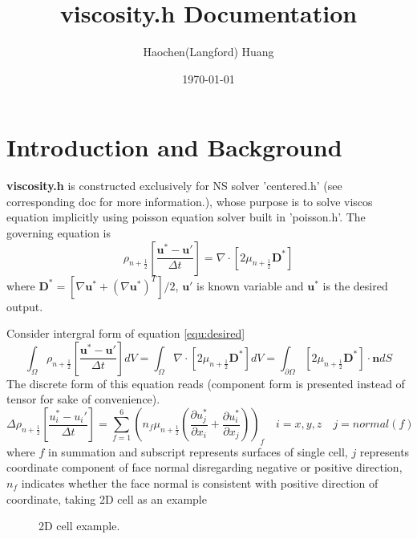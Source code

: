 \documentclass[a4paper]{article}
\title{viscosity.h Documentation}
\author{Haochen(Langford) Huang}
\date{\today}
\begin{document}
\maketitle

\section{Introduction and Background}
\textbf{viscosity.h} is constructed exclusively for NS solver 'centered.h' (see corresponding doc for more information.), whose purpose is to solve viscos equation implicitly using poisson equation solver built in 'poisson.h'. The governing equation is 
\begin{equation}\label{equ:desired}
  \rho_{n+ \frac{1}{2}}[ \frac{ \mathbf{u}^*- \mathbf{u}'}{\Delta t}] = \nabla\cdot [2\mu_{n+ \frac{1}{2}} \mathbf{D}^*]
\end{equation}
where $ \mathbf{D}^* = [\nabla \mathbf{u}^*+ (\nabla \mathbf{u}^*)^T]/2$, $ \mathbf{u}'$ is known variable and $ \mathbf{u}^*$ is the desired output.\par
Consider intergral form of equation \ref{equ:desired}
\begin{equation}
  \int_{\Omega}\rho_{n+ \frac{1}{2}} [ \frac{ \mathbf{u}^*- \mathbf{u}'}{\Delta t}]dV = \int_{\Omega}\nabla\cdot[2\mu_{n+ \frac{1}{2}} \mathbf{D}^*] dV = \int_{\partial \Omega} [2\mu_{n+ \frac{1}{2}} \mathbf{D}^*]\cdot \mathbf{n}dS
\end{equation}
The discrete form of this equation reads (component form is presented instead of tensor for sake of convenience).
\begin{equation}\label{equ:discrete}
  \Delta \rho_{n+ \frac{1}{2}} [ \frac{u_i^*-u_i'}{\Delta t} ] = \sum_{f = 1}^6(n_f \mu_{n+ \frac{1}{2}}( \frac{\partial u_j^*}{\partial x_i}+ \frac{\partial u_i^*}{\partial x_j}))_f \quad i= x,y,z\quad j = normal(f)
\end{equation}
where $f$ in summation and subscript represents surfaces of single cell, $j$ represents coordinate component of face normal disregarding negative or positive direction, $n_f$ indicates whether the face normal is consistent with positive direction of coordinate, taking 2D cell as an example
\begin{figure}[H]
    \centering
    \caption{2D cell example.}
    \label{fig:2Dexample}
\end{figure}
\end{document}
